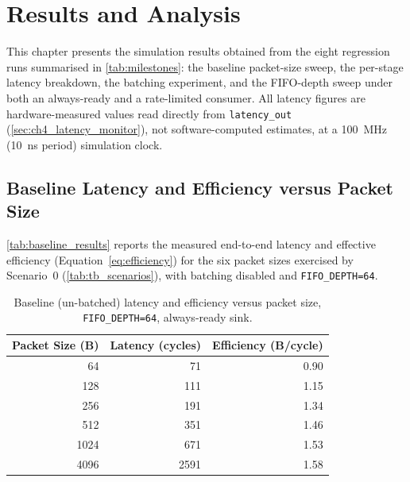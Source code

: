 
\chapter{Results and Analysis}

\label{Chapter7}


This chapter presents the simulation results obtained from the eight regression runs summarised in \autoref{tab:milestones}: the baseline packet-size sweep, the per-stage latency breakdown, the batching experiment, and the FIFO-depth sweep under both an always-ready and a rate-limited consumer. All latency figures are hardware-measured values read directly from \texttt{latency\_out} (\autoref{sec:ch4_latency_monitor}), not software-computed estimates, at a 100~MHz (10~ns period) simulation clock.


\section{Baseline Latency and Efficiency versus Packet Size}
\label{sec:ch7_baseline}

\autoref{tab:baseline_results} reports the measured end-to-end latency and effective efficiency (Equation~\ref{eq:efficiency}) for the six packet sizes exercised by Scenario~0 (\autoref{tab:tb_scenarios}), with batching disabled and \texttt{FIFO\_DEPTH=64}.

\begin{table}[htbp]
\centering
\begin{tabular}{@{}rrr@{}}
\toprule
\textbf{Packet Size (B)} & \textbf{Latency (cycles)} & \textbf{Efficiency (B/cycle)} \\
\midrule
64    & 71   & 0.90 \\
128   & 111  & 1.15 \\
256   & 191  & 1.34 \\
512   & 351  & 1.46 \\
1024  & 671  & 1.53 \\
4096  & 2591 & 1.58 \\
\bottomrule
\end{tabular}
\caption{Baseline (un-batched) latency and efficiency versus packet size, \texttt{FIFO\_DEPTH=64}, always-ready sink.}
\label{tab:baseline_results}
\end{table}

